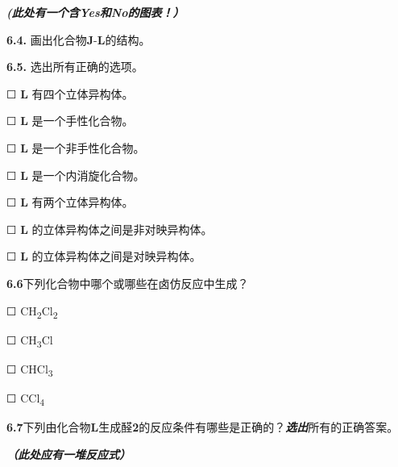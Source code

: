 \textbf{\emph{(此处有一个含Yes和No的图表！）}}

\noindent\textbf{6.4.} 画出化合物\textbf{J}-\textbf{L}的结构。

\noindent\textbf{6.5.} 选出所有正确的选项。

☐ \textbf{L} 有四个立体异构体。

☐ \textbf{L} 是一个手性化合物。

☐ \textbf{L} 是一个非手性化合物。

☐ \textbf{L} 是一个内消旋化合物。

☐ \textbf{L} 有两个立体异构体。

☐ \textbf{L} 的立体异构体之间是非对映异构体。

☐ \textbf{L} 的立体异构体之间是对映异构体。

\noindent\textbf{6.6}下列化合物中哪个或哪些在卤仿反应中生成？

☐ CH\textsubscript{2}Cl\textsubscript{2}

☐ CH\textsubscript{3}Cl

☐ CHCl\textsubscript{3}

☐ CCl\textsubscript{4}

\noindent\textbf{6.7}下列由化合物\textbf{L}生成醛\textbf{2}的反应条件有哪些是正确的？\textbf{\emph{选出}}所有的正确答案。

\textbf{\emph{（此处应有一堆反应式）}}
